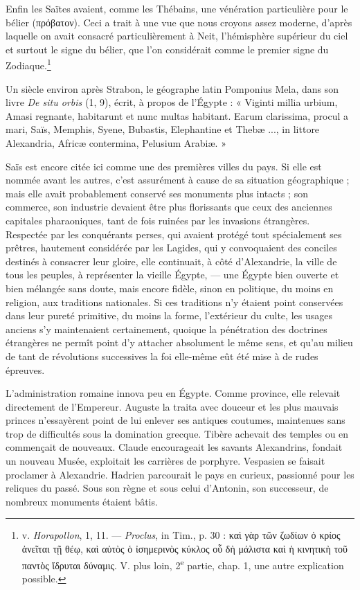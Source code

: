 \documentclass[a4paper, 11pt, oneside]{article}
\begin{document}
Enfin les Saïtes avaient, comme les Thébains, une vénération particulière pour le bélier (πρόβατον). Ceci a trait à une vue que nous croyons assez moderne, d'après laquelle on avait consacré particulièrement à Neit, l'hémisphère supérieur du ciel et surtout le signe du bélier, que l'on considérait comme le premier signe du Zodiaque.\footnote{v. \emph{Horapollon}, 1, 11. --- \emph{Proclus}, in Tim., p. 30 : καὶ γὰρ τῶν ζωδίων ὁ κρίος ἀνεῖται τῇ θέῳ, καὶ αὐτὸς ὁ ἰσημερινὸς κύκλος οὗ δὴ μάλιστα καὶ ἡ κινητικὴ τοῦ παντὸς ἵδρυται δύναμις. V. plus loin, 2\textsuperscript{e} partie, chap. 1, une autre explication possible.}

Un siècle environ après Strabon, le géographe latin Pomponius Mela, dans son livre \emph{De situ orbis} (1, 9), écrit, à propos de l'Égypte : « Viginti millia urbium, Amasi regnante, habitarunt et nunc multas habitant. Earum clarissima, procul a mari, Saïs, Memphis, Syene, Bubastis, Elephantine et Thebæ ..., in littore Alexandria, Africæ contermina, Pelusium Arabiæ. »

Saïs est encore citée ici comme une des premières villes du pays. Si elle est nommée avant les autres, c'est assurément à cause de sa situation géographique ; mais elle avait probablement conservé ses monuments plus intacts ; son commerce, son industrie devaient être plus florissants que ceux des anciennes capitales pharaoniques, tant de fois ruinées par les invasions étrangères. Respectée par les conquérants perses, qui avaient protégé tout spécialement ses prêtres, hautement considérée par les Lagides, qui y convoquaient des conciles destinés à consacrer leur gloire, elle continuait, à côté d'Alexandrie, la ville de tous les peuples, à représenter la vieille Égypte, --- une Égypte bien ouverte et bien mélangée sans doute, mais encore fidèle, sinon en politique, du moins en religion, aux traditions nationales. Si ces traditions n'y étaient point conservées dans leur pureté primitive, du moins la forme, l'extérieur du culte, les usages anciens s'y maintenaient certainement, quoique la pénétration des doctrines étrangères ne permît point d'y attacher absolument le même sens, et qu'au milieu de tant de révolutions successives la foi elle-même eût été mise à de rudes épreuves.

L'administration romaine innova peu en Égypte. Comme province, elle relevait directement de l'Empereur. Auguste la traita avec douceur et les plus mauvais princes n'essayèrent point de lui enlever ses antiques coutumes, maintenues sans trop de difficultés sous la domination grecque. Tibère achevait des temples ou en commençait de nouveaux. Claude encourageait les savants Alexandrins, fondait un nouveau Musée, exploitait les carrières de porphyre. Vespasien se faisait proclamer à Alexandrie. Hadrien parcourait le pays en curieux, passionné pour les reliques du passé. Sous son règne et sous celui d'Antonin, son successeur, de nombreux monuments étaient bâtis.
\end{document}
